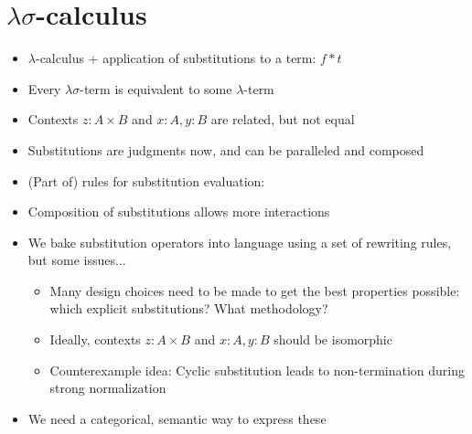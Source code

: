 \documentclass[11pt]{article}
\begin{document}
\section[Lambda-sigma-calculus]{$\lambda\sigma$-calculus}
\begin{itemize}
    \item $\lambda$-calculus + application of substitutions to a term: $f \ast t$
    \item Every $\lambda\sigma$-term is equivalent to some $\lambda$-term
    \item Contexts $z: A \times B$ and $x:A, y:B$ are related, but not equal
    \item Substitutions are judgments now, and can be paralleled and composed
    \item (Part of) rules for substitution evaluation:
    \item Composition of substitutions allows more interactions 
    \item We bake substitution operators into language using a set of rewriting rules, but some issues$\ldots$ \begin{itemize}
        \item Many design choices need to be made to get the best properties possible: which explicit substitutions? What methodology? 
        \item Ideally, contexts $z: A \times B$ and $x:A, y:B$ should be isomorphic
        \item Counterexample idea: Cyclic substitution leads to non-termination during strong normalization
    \end{itemize}    
    \item We need a categorical, semantic way to express these
\end{itemize}
\end{document}
